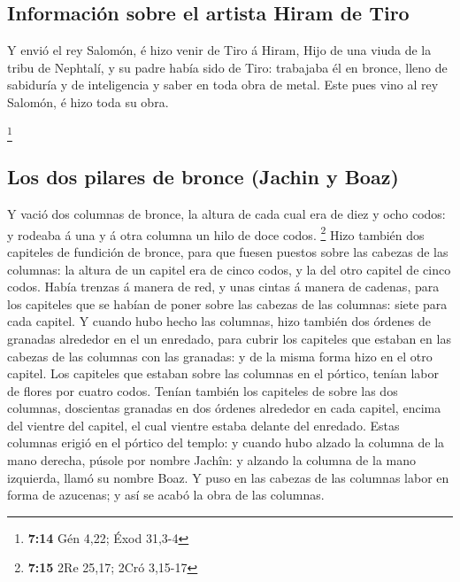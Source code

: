 \hypertarget{informaciuxf3n-sobre-el-artista-hiram-de-tiro}{%
\subsection{Información sobre el artista Hiram de
Tiro}\label{informaciuxf3n-sobre-el-artista-hiram-de-tiro}}

 Y envió el rey Salomón, é hizo venir de Tiro á Hiram,
 Hijo de una viuda de la tribu de Nephtalí, y su padre
había sido de Tiro: trabajaba él en bronce, lleno de sabiduría y de
inteligencia y saber en toda obra de metal. Este pues vino al rey
Salomón, é hizo toda su obra.

\footnote{\textbf{7:14} Gén 4,22; Éxod 31,3-4}

\hypertarget{los-dos-pilares-de-bronce-jachin-y-boaz}{%
\subsection{Los dos pilares de bronce (Jachin y
Boaz)}\label{los-dos-pilares-de-bronce-jachin-y-boaz}}

 Y vació dos columnas de bronce, la altura de cada cual era
de diez y ocho codos: y rodeaba á una y á otra columna un hilo de doce
codos. \footnote{\textbf{7:15} 2Re 25,17; 2Cró 3,15-17} 
Hizo también dos capiteles de fundición de bronce, para que fuesen
puestos sobre las cabezas de las columnas: la altura de un capitel era
de cinco codos, y la del otro capitel de cinco codos. 
Había trenzas á manera de red, y unas cintas á manera de cadenas, para
los capiteles que se habían de poner sobre las cabezas de las columnas:
siete para cada capitel.  Y cuando hubo hecho las columnas,
hizo también dos órdenes de granadas alrededor en el un enredado, para
cubrir los capiteles que estaban en las cabezas de las columnas con las
granadas: y de la misma forma hizo en el otro capitel.  Los
capiteles que estaban sobre las columnas en el pórtico, tenían labor de
flores por cuatro codos.  Tenían también los capiteles de
sobre las dos columnas, doscientas granadas en dos órdenes alrededor en
cada capitel, encima del vientre del capitel, el cual vientre estaba
delante del enredado.  Estas columnas erigió en el pórtico
del templo: y cuando hubo alzado la columna de la mano derecha, púsole
por nombre Jachîn: y alzando la columna de la mano izquierda, llamó su
nombre Boaz.  Y puso en las cabezas de las columnas labor
en forma de azucenas; y así se acabó la obra de las columnas.


